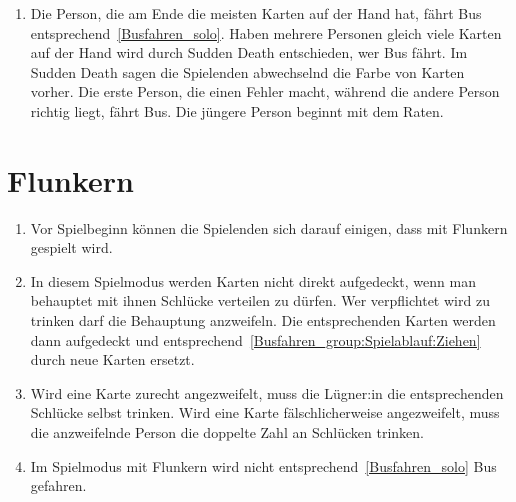 \begin{enumerate}[label={(\arabic*)}]
    \item
    Die Person, die am Ende die meisten Karten auf der Hand hat, fährt Bus entsprechend~\ref{Busfahren_solo}.
    Haben mehrere Personen gleich viele Karten auf der Hand wird durch Sudden Death entschieden, wer Bus fährt.
    Im Sudden Death sagen die Spielenden abwechselnd die Farbe von Karten vorher.
    Die erste Person, die einen Fehler macht, während die andere Person richtig liegt, fährt Bus.
    Die jüngere Person beginnt mit dem Raten.
\end{enumerate}

\section{Flunkern}
\begin{enumerate}[label={(\arabic*)}]
\item
Vor Spielbeginn können die Spielenden sich darauf einigen, dass mit Flunkern gespielt wird.

\item
In diesem Spielmodus werden Karten nicht direkt aufgedeckt, wenn man behauptet mit ihnen Schlücke verteilen zu dürfen.
Wer verpflichtet wird zu trinken darf die Behauptung anzweifeln.
Die entsprechenden Karten werden dann aufgedeckt und entsprechend~\ref{Busfahren_group:Spielablauf:Ziehen} durch neue Karten ersetzt.

\item
Wird eine Karte zurecht angezweifelt, muss die Lügner:in die entsprechenden Schlücke selbst trinken.
Wird eine Karte fälschlicherweise angezweifelt, muss die anzweifelnde Person die doppelte Zahl an Schlücken trinken.

\item
Im Spielmodus mit Flunkern wird nicht entsprechend~\ref{Busfahren_solo} Bus gefahren.
\end{enumerate}
